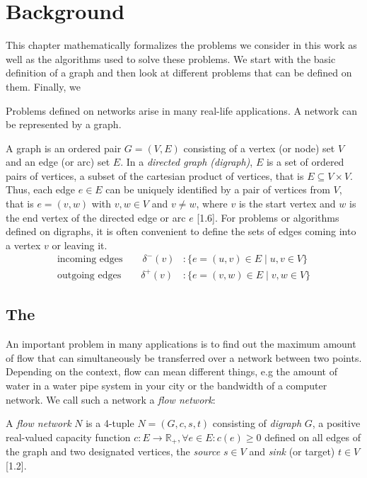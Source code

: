 \chapter{Background}\label{ch:3}
This chapter mathematically formalizes the problems we consider in this work as well as the algorithms used to solve these problems. We start with the basic definition of a graph and then look at different problems that can be defined on them. Finally, we  

Problems defined on networks arise in many real-life applications. A network can be represented by a graph.

\newcommand{\Ein}[1]{\delta^-(#1)}
\newcommand{\Eout}[1]{\delta^+(#1)}
\newcommand{\ein}{{e_{\text{in}}}}
\newcommand{\eout}{{e_{\text{out}}}}

\begin{definition}
A graph is an ordered pair $G = (V, E)$ consisting of a vertex (or node) set $V$ and an edge (or arc) set $E$. In a \textit{directed graph (digraph)}, $E$ is a set of ordered pairs of vertices, a subset of the cartesian product of vertices, that is $E \subseteq V \times V$. Thus, each edge $e \in E$ can be uniquely identified by a pair of vertices from $V$, that is $e=(v,w)$ with $v,w \in V$ and $v \neq w$, where $v$ is the start vertex and $w$ is the end vertex of the directed edge or arc $e$ \cite{jungnickel2013graphs}[1.6]. For problems or algorithms defined on digraphs, it is often convenient to define the sets of edges coming into a vertex $v$ or leaving it.
\begin{align}
\text{incoming edges} \quad \quad \Ein{v}  &: \{ e=(u,v) \in E \; | \; u,v \in V \}  \\
\text{outgoing edges} \quad \quad \Eout{v} &: \{ e=(v,w) \in E \; | \; v,w \in V \}
\end{align}
\end{definition}


\section{The \maxflow{}}
An important problem in many applications is to find out the maximum amount of flow that can simultaneously be transferred over a network between two points. %
Depending on the context, flow can mean different things, e.g the amount of water in a water pipe system in your city or the bandwidth of a computer network. We call such a network a \textit{flow network}:

\begin{definition}
A \textit{flow network} $N$ is a 4-tuple $N=(G,c,s,t)$ consisting of \textit{digraph} $G$, a positive real-valued capacity function $c: E \rightarrow \mathbb{R}_+ , \forall e \in E : c(e) \geq 0$ defined on all edges of the graph and two designated vertices, the \textit{source} $s \in V$ and \textit{sink} (or target) $t \in V$ \cite{ahuja1993network}[1.2].
\end{definition}



